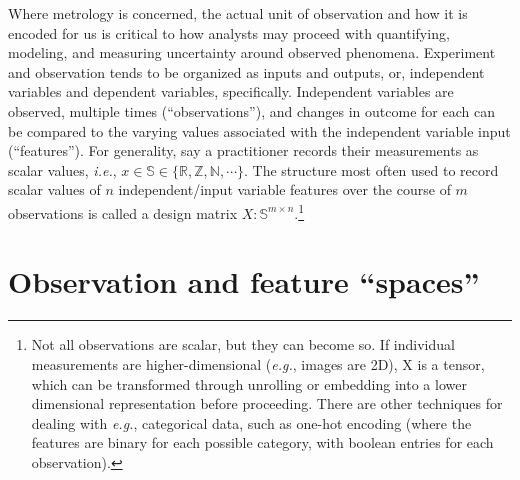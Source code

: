 \documentclass[%
	12pt,
		oneside,
		letterpaper
]{book}
\begin{document}
Where metrology is concerned, the actual unit of observation and how it is encoded for us is critical to how analysts may proceed with quantifying, modeling, and measuring uncertainty around observed phenomena.
Experiment and observation tends to be organized as inputs and outputs, or, independent variables and dependent variables, specifically.
Independent variables are observed, multiple times (``observations''), and changes in outcome for each can be compared to the varying values associated with the independent variable input (``features'').
For generality, say a practitioner records their measurements as scalar values, \emph{i.e.}, \(x\in\mathbb{S}\in\{\mathbb{R,Z,N},\cdots\}\).
The structure most often used to record scalar values of \(n\) independent/input variable features over the course of \(m\) observations is called a design matrix \(X:\mathbb{S}^{m\times n}\).\footnote{
  Not all observations are scalar, but they can become so.
  If individual measurements are higher-dimensional (\emph{e.g.}, images are 2D), X is a tensor, which can be transformed through unrolling or embedding into a lower dimensional representation before proceeding.
  There are other techniques for dealing with \emph{e.g.}, categorical data, such as one-hot encoding (where the features are binary for each possible category, with boolean entries for each observation).}

\section{Observation and feature ``spaces''}\label{sec-matrix-notation}
\end{document}
